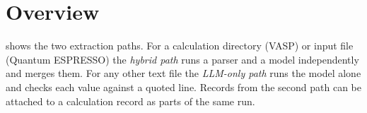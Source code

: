 \documentclass[11pt,a4paper]{article}
\begin{document}
\vspace{0.6cm}
{\headfont\small
\setlength{\columnsep}{1.2cm}
\noindent\begin{minipage}{\linewidth}
\renewcommand{\contentsname}{\headfont\large\bfseries\color{accent}Contents}
\tableofcontents
\end{minipage}}

\newpage
\section{Overview}\label{sec:overview}

 shows the two extraction paths. For a calculation directory (VASP) or input file
(Quantum ESPRESSO) the \emph{hybrid path} runs a parser and a model independently and merges them. For any
other text file the \emph{LLM-only path} runs the model alone and checks each value against a quoted line.
Records from the second path can be attached to a calculation record as parts of the same run.
\end{document}
